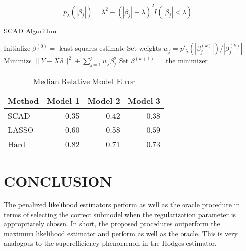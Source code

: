 \documentclass[8pt,twocolumn]{article}
\begin{document}
\begin{equation}
  \label{eq:example}
  p_{\lambda}(|\beta_j|) = \lambda^2 - (|\beta_j| - \lambda)^2 I(|\beta_j| < \lambda)
\end{equation}

\begin{algorithm}
  \caption{SCAD Algorithm}
  \label{alg:scad}
  \begin{algorithmic}[1]
    \State Initialize $\beta^{(0)} = $ least squares estimate
      \State Set weights $w_j = p'_{\lambda}(|\beta_j^{(k)}|)/|\beta_j^{(k)}|$
      \State Minimize $\|Y - X\beta\|^2 + \sum_{j=1}^p w_j \beta_j^2$
      \State Set $\beta^{(k+1)} = $ the minimizer
    \EndFor
  \end{algorithmic}
\end{algorithm}

\begin{table}[ht]
  \centering
  \caption{Median Relative Model Error}
  \label{tab:example}
  \begin{tabular}{@{}lrrr@{}}
    \toprule
    Method & Model 1 & Model 2 & Model 3 \\
    \midrule
    SCAD & 0.35 & 0.42 & 0.38 \\
    LASSO & 0.60 & 0.58 & 0.59 \\
    Hard & 0.82 & 0.71 & 0.73 \\
    \bottomrule
  \end{tabular}
\end{table}

\section{CONCLUSION}

The penalized likelihood estimators perform as well as the oracle procedure in terms of selecting the correct submodel when the regularization parameter is appropriately chosen. In short, the proposed procedures outperform the maximum likelihood estimator and perform as well as the oracle. This is very analogous to the superefficiency phenomenon in the Hodges estimator.


\end{document}
